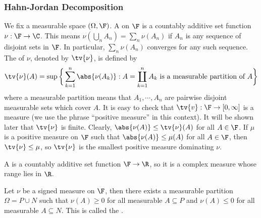 \documentclass[a4paper]{article}
\begin{document}
\subsubsection*{Hahn-Jordan Decomposition}
We fix a measurable space $(\Omega,\F)$. A  on $\F$ is a countably additive set function $\nu:\F\to\C$. This means $\nu(\bigcup_n A_n)=\sum_n\nu(A_n)$ if $A_n$ is any sequence of disjoint sets in $\F$. In particular, $\sum_n\nu(A_n)$ converges for any such sequence. The  of $\nu$, denoted by $\tv{\nu}$, is defined by
  \[
    \tv{\nu}(A)=\sup\bigg\{\sum_{k=1}^n\abs{\nu(A_k)}:A=\coprod_{k=1}^n A_k\text{ is a measurable partition of $A$}\bigg\}
  \]
where a measurable partition means that $A_1,\cdots,A_n$ are pairwise disjoint measurable sets which cover $A$. It is easy to check that $\tv{v}:\F\to[0,\infty]$ is a measure (we use the phrase ``positive measure'' in this context). It will be shown later that $\tv{\nu}$ is finite. Clearly, $\abs{\nu(A)}\leq\tv{\nu}(A)$ for all $A\in\F$. If $\mu$ is a positive measure on $\F$ such that $\abs{\nu(A)}\leq\mu(A)$ for all $A\in\F$, then $\tv{\nu}\leq\mu$, so $\tv{\nu}$ is the smallest positive measure dominating $\nu$.

A  is a countably additive set function $\F\to\R$, so it is a complex measure whose range lies in $\R$.

\begin{nthm}\label{thm:HahnDecomposition}
  Let $\nu$ be a signed measure on $\F$, then there exists a measurable partition $\Omega=P\cup N$ such that $\nu(A)\geq 0$ for all measurable $A\subseteq P$ and $\nu(A)\leq 0$ for all measurable $A\subseteq N$. This is called the .
\end{nthm}
\end{document}
